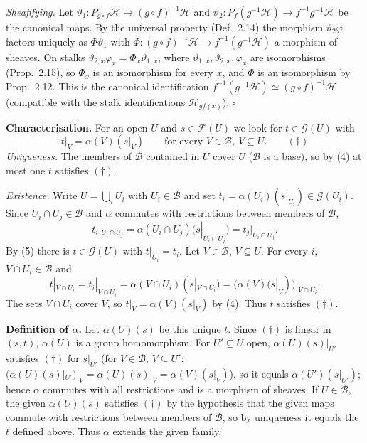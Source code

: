 \documentclass[11pt]{article}
\begin{document}
\emph{Sheafifying.} Let $\vartheta_1:P_{g\circ f}\mathcal H\to(g\circ f)^{-1}\mathcal H$ and $\vartheta_2:P_f(g^{-1}\mathcal H)\to f^{-1}g^{-1}\mathcal H$ be the canonical maps. By the universal property (Def.~2.14) the morphism $\vartheta_2\varphi$ factors uniquely as $\Phi\vartheta_1$ with $\Phi:(g\circ f)^{-1}\mathcal H\to f^{-1}(g^{-1}\mathcal H)$ a morphism of sheaves. On stalks $\vartheta_{2,x}\varphi_x=\Phi_x\vartheta_{1,x}$, where $\vartheta_{1,x},\vartheta_{2,x},\varphi_x$ are isomorphisms (Prop.~2.15), so $\Phi_x$ is an isomorphism for every $x$, and $\Phi$ is an isomorphism by Prop.~2.12. This is the canonical identification $f^{-1}(g^{-1}\mathcal H)\simeq(g\circ f)^{-1}\mathcal H$ (compatible with the stalk identifications $\mathcal H_{gf(x)}$). \hfill$\square$

\pf
\textbf{Characterisation.} For an open $U$ and $s\in\mathcal F(U)$ we look for $t\in\mathcal G(U)$ with
\[ t|_V=\alpha(V)(s|_V)\qquad\text{for every }V\in\mathcal B,\ V\subseteq U.\qquad(\dagger) \]
\emph{Uniqueness.} The members of $\mathcal B$ contained in $U$ cover $U$ ($\mathcal B$ is a base), so by (4) at most one $t$ satisfies $(\dagger)$.

\emph{Existence.} Write $U=\bigcup_iU_i$ with $U_i\in\mathcal B$ and set $t_i=\alpha(U_i)(s|_{U_i})\in\mathcal G(U_i)$. Since $U_i\cap U_j\in\mathcal B$ and $\alpha$ commutes with restrictions between members of $\mathcal B$,
\[ t_i|_{U_i\cap U_j}=\alpha(U_i\cap U_j)(s|_{U_i\cap U_j})=t_j|_{U_i\cap U_j}. \]
By (5) there is $t\in\mathcal G(U)$ with $t|_{U_i}=t_i$. Let $V\in\mathcal B$, $V\subseteq U$. For every $i$, $V\cap U_i\in\mathcal B$ and
\[ t|_{V\cap U_i}=t_i|_{V\cap U_i}=\alpha(V\cap U_i)(s|_{V\cap U_i})=\bigl(\alpha(V)(s|_V)\bigr)|_{V\cap U_i}. \]
The sets $V\cap U_i$ cover $V$, so $t|_V=\alpha(V)(s|_V)$ by (4). Thus $t$ satisfies $(\dagger)$.

\textbf{Definition of $\alpha$.} Let $\alpha(U)(s)$ be this unique $t$. Since $(\dagger)$ is linear in $(s,t)$, $\alpha(U)$ is a group homomorphism. For $U'\subseteq U$ open, $\alpha(U)(s)|_{U'}$ satisfies $(\dagger)$ for $s|_{U'}$ (for $V\in\mathcal B$, $V\subseteq U'$: $(\alpha(U)(s)|_{U'})|_V=\alpha(U)(s)|_V=\alpha(V)(s|_V)$), so it equals $\alpha(U')(s|_{U'})$; hence $\alpha$ commutes with all restrictions and is a morphism of sheaves. If $U\in\mathcal B$, the given $\alpha(U)(s)$ satisfies $(\dagger)$ by the hypothesis that the given maps commute with restrictions between members of $\mathcal B$, so by uniqueness it equals the $t$ defined above. Thus $\alpha$ extends the given family.
\end{document}
